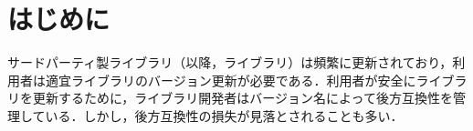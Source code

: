 \documentclass[T,J]{fose} %
\begin{document}

\section{はじめに}
サードパーティ製ライブラリ（以降，ライブラリ）は頻繁に更新されており，利用者は適宜ライブラリのバージョン更新が必要である．利用者が安全にライブラリを更新するために，ライブラリ開発者はバージョン名によって後方互換性を管理している．しかし，後方互換性の損失が見落とされることも多い．
\end{document}
